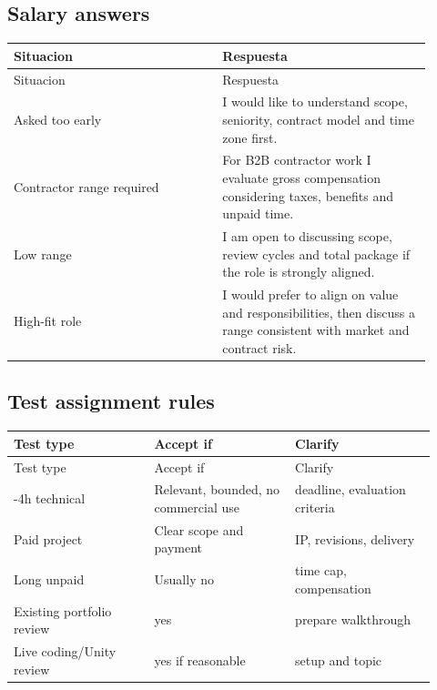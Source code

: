 \subsection{Salary answers}


\begin{center}
\scriptsize
\begin{longtable}{>{\raggedright\arraybackslash}p{0.455\linewidth} >{\raggedright\arraybackslash}p{0.455\linewidth}}
\toprule
Situacion & Respuesta \\
\midrule
\endfirsthead
\toprule
Situacion & Respuesta \\
\midrule
\endhead
Asked too early & I would like to understand scope, seniority, contract model and time zone first. \\
Contractor range required & For B2B contractor work I evaluate gross compensation considering taxes, benefits and unpaid time. \\
Low range & I am open to discussing scope, review cycles and total package if the role is strongly aligned. \\
High-fit role & I would prefer to align on value and responsibilities, then discuss a range consistent with market and contract risk. \\
\bottomrule
\end{longtable}
\end{center}


\subsection{Test assignment rules}


\begin{center}
\scriptsize
\begin{longtable}{>{\raggedright\arraybackslash}p{0.305\linewidth} >{\raggedright\arraybackslash}p{0.305\linewidth} >{\raggedright\arraybackslash}p{0.305\linewidth}}
\toprule
Test type & Accept if & Clarify \\
\midrule
\endfirsthead
\toprule
Test type & Accept if & Clarify \\
\midrule
\endhead
2-4h technical & Relevant, bounded, no commercial use & deadline, evaluation criteria \\
Paid project & Clear scope and payment & IP, revisions, delivery \\
Long unpaid & Usually no & time cap, compensation \\
Existing portfolio review & yes & prepare walkthrough \\
Live coding/Unity review & yes if reasonable & setup and topic \\
\bottomrule
\end{longtable}
\end{center}


